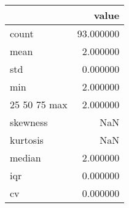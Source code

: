 \begin{tabular}{lr}
\toprule
 & value \\
\midrule
count & 93.000000 \\
mean & 2.000000 \\
std & 0.000000 \\
min & 2.000000 \\
25%
50%
75%
max & 2.000000 \\
skewness & NaN \\
kurtosis & NaN \\
median & 2.000000 \\
iqr & 0.000000 \\
cv & 0.000000 \\
\bottomrule
\end{tabular}
